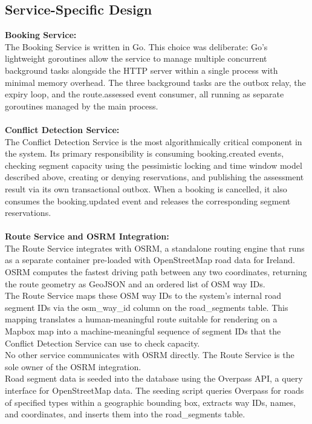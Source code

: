 \documentclass{article}
\begin{document}
\subsection{Service-Specific Design}
\textbf{Booking Service:}\\
The Booking Service is written in Go. This choice was deliberate: Go's lightweight goroutines allow the service to manage multiple concurrent background tasks alongside the HTTP server within a single process with minimal memory overhead. The three background tasks are the outbox relay, the expiry loop, and the route.assessed event consumer, all running as separate goroutines managed by the main process.\\\\
\textbf{Conflict Detection Service:}\\
The Conflict Detection Service is the most algorithmically critical component in the system. Its primary responsibility is consuming booking.created events, checking segment capacity using the pessimistic locking and time window model described above, creating or denying reservations, and publishing the assessment result via its own transactional outbox. When a booking is cancelled, it also consumes the booking.updated event and releases the corresponding segment reservations.\\\\
\textbf{Route Service and OSRM Integration:}\\
The Route Service integrates with OSRM, a standalone routing engine that runs as a separate container pre-loaded with OpenStreetMap road data for Ireland. OSRM computes the fastest driving path between any two coordinates, returning the route geometry as GeoJSON and an ordered list of OSM way IDs.\\
The Route Service maps these OSM way IDs to the system's internal road segment IDs via the osm_way_id column on the road_segments table. This mapping translates a human-meaningful route suitable for rendering on a Mapbox map into a machine-meaningful sequence of segment IDs that the Conflict Detection Service can use to check capacity.\\
No other service communicates with OSRM directly. The Route Service is the sole owner of the OSRM integration.\\
Road segment data is seeded into the database using the Overpass API, a query interface for OpenStreetMap data. The seeding script queries Overpass for roads of specified types within a geographic bounding box, extracts way IDs, names, and coordinates, and inserts them into the road_segments table.
\end{document}
